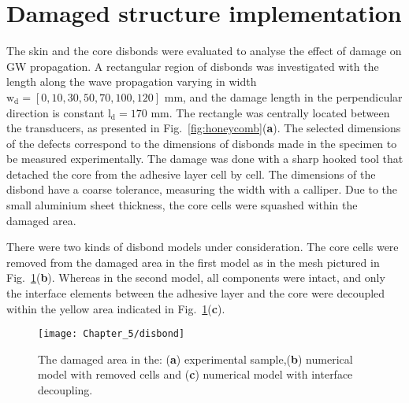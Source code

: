 \section{Damaged structure implementation}
\label{sec:disbond}
The skin and the core disbonds were evaluated to analyse the effect of damage on GW propagation.
A rectangular region of disbonds was investigated with the length along the wave propagation varying in width \(\mathrm{w_d} = [0,10,30,50,70,100,120]\) mm, and the damage length in the perpendicular direction is constant \(\mathrm{l_d} = 170\) mm.
The rectangle was centrally located between the transducers, as presented in Fig.~\ref{fig:honeycomb}(\textbf{a}).
The selected dimensions of the defects correspond to the dimensions of disbonds made in the specimen to be measured experimentally.
The damage was done with a sharp hooked tool that detached the core from the adhesive layer cell by cell.
The dimensions of the disbond have a coarse tolerance, measuring the width with a calliper.
Due to the small aluminium sheet thickness, the core cells were squashed within the damaged area.

There were two kinds of disbond models under consideration.
The core cells were removed from the damaged area in the first model as in the mesh pictured in Fig.~\ref{fig:disbond}(\textbf{b}).
Whereas in the second model, all components were intact, and only the interface elements between the adhesive layer and the core were decoupled within the yellow area indicated in Fig.~\ref{fig:disbond}(\textbf{c}).
\begin{figure}
	\begin{center}
		\texttt{[image: Chapter\_5/disbond]}
	\end{center}
	\caption{The damaged area in the: (\textbf{a}) experimental sample,(\textbf{b}) numerical model with removed cells and (\textbf{c}) numerical model with interface decoupling.}
	\label{fig:disbond}
\end{figure}